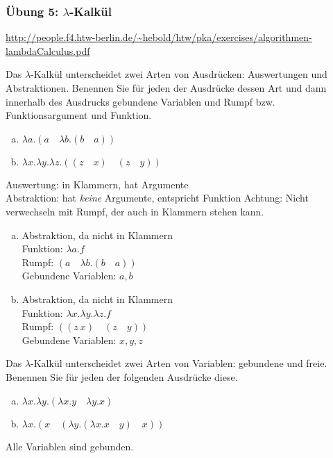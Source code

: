 \begin{card}
  \frametitle{Übung 5: $\lambda$-Kalkül}
  \url{http://people.f4.htw-berlin.de/~hebold/htw/pka/exercises/algorithmen-lambdaCalculus.pdf}
\end{card}

\begin{card}
  Das $\lambda$-Kalkül unterscheidet zwei Arten von Ausdrücken: Auswertungen und Abstraktionen. Benennen Sie für jeden der Ausdrücke dessen Art und dann innerhalb des Ausdrucks gebundene Variablen und Rumpf bzw. Funktionsargument und Funktion.
  \begin{enumerate}[a)]
    \item $\lambda a.(a \quad \lambda b.(b \quad a))$
    \item $\lambda x.\lambda y.\lambda z.((z \quad x) \quad (z \quad y))$
  \end{enumerate}
  \hr
  Auswertung: in Klammern, hat Argumente\\
  Abstraktion: hat \textit{keine} Argumente, entspricht Funktion
  Achtung: Nicht verwechseln mit Rumpf, der auch in Klammern stehen kann.
  \begin{enumerate}[a)]
    \item Abstraktion, da nicht in Klammern\\
      Funktion: $\lambda a.f$\\
      Rumpf: $(a \quad \lambda b.(b \quad a))$\\
      Gebundene Variablen: $a, b$
    \item Abstraktion, da nicht in Klammern\\
      Funktion: $\lambda x.\lambda y.\lambda z.f$ \\
      Rumpf: $((z \ x) \quad (z \quad y))$\\
      Gebundene Variablen: $x,y,z$
  \end{enumerate}
\end{card}

\begin{card}
  Das $\lambda$-Kalkül unterscheidet zwei Arten von Variablen: gebundene und freie. Benennen Sie für jeden der folgenden Ausdrücke diese.
  \begin{enumerate}[a)]
    \item $\lambda x.\lambda y.(\lambda x.y \quad \lambda y.x)$
    \item $\lambda x.(x \quad (\lambda y.(\lambda x.x \quad y) \quad x))$
  \end{enumerate}
  \hr
  Alle Variablen sind gebunden.
\end{card}

